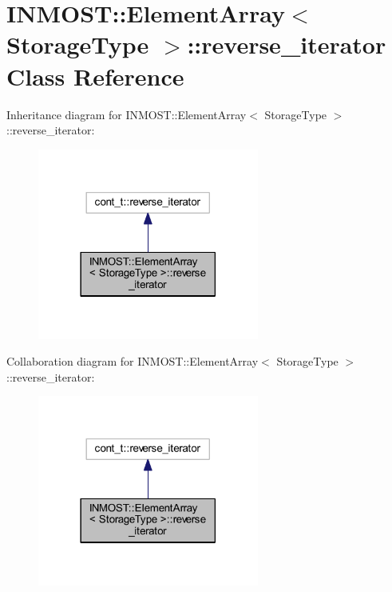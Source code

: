 \hypertarget{classINMOST_1_1ElementArray_1_1reverse__iterator}{\section{I\-N\-M\-O\-S\-T\-:\-:Element\-Array$<$ Storage\-Type $>$\-:\-:reverse\-\_\-iterator Class Reference}
\label{classINMOST_1_1ElementArray_1_1reverse__iterator}
}


Inheritance diagram for I\-N\-M\-O\-S\-T\-:\-:Element\-Array$<$ Storage\-Type $>$\-:\-:reverse\-\_\-iterator\-:
\nopagebreak
\begin{figure}[H]
\begin{center}
\leavevmode
\includegraphics[width=206pt]{classINMOST_1_1ElementArray_1_1reverse__iterator__inherit__graph}
\end{center}
\end{figure}


Collaboration diagram for I\-N\-M\-O\-S\-T\-:\-:Element\-Array$<$ Storage\-Type $>$\-:\-:reverse\-\_\-iterator\-:
\nopagebreak
\begin{figure}[H]
\begin{center}
\leavevmode
\includegraphics[width=206pt]{classINMOST_1_1ElementArray_1_1reverse__iterator__coll__graph}
\end{center}
\end{figure}
